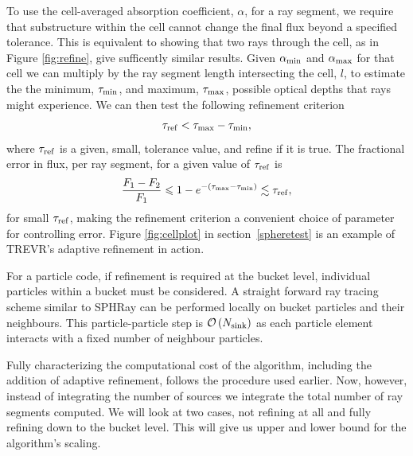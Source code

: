 \documentclass[fleq,usenatbib]{mnras}
\newcommand{\acro}{TREVR}
\newcommand{\bigO}[1]{\mathcal{O}\left(#1\right)}
\newcommand{\NK}{N_{\rm sink}}
\newcommand{\tr}{\tau_{\rm ref}}
\begin{document}
{To use the cell-averaged absorption coefficient, $\alpha$, for a ray segment,
we require that substructure within the cell cannot change the final flux
beyond a specified tolerance.
This is equivalent to showing that two rays through the cell,
as in Figure \ref{fig:refine}, give sufficently similar results.
Given $\alpha_{\rm min}$ and $\alpha_{\rm max}$ for that cell we can multiply
by the ray segment length intersecting the cell, 
$l$, to estimate the the minimum, $\tau_{\rm min}$, and maximum, $\tau_{\rm max}$,
possible optical depths that rays might experience.
We can then test the following refinement criterion
\begin{equation}
\label{eqn:refcrit}
\tr < \tau_{\rm max} - \tau_{\rm min},
\end{equation}
where $\tr$ is a given, small, tolerance value, and refine if it is true. The 
fractional error in flux, per ray segment, for a given value of $\tr$ is
\begin{equation}
\label{eqn:reffrac}
\frac{F_1 - F_2}{F_1} \leq 1 - e^{-(\tau_{\rm max}-\tau_{\rm min})} 
\lesssim \tr,
\end{equation}
for small $\tr$, making the refinement criterion a convenient choice of 
parameter for controlling error. Figure \ref{fig:cellplot} in section~\ref{spheretest}
is an example of 
\acro{}'s adaptive refinement in action.

For a particle code, if refinement is required at the bucket level, individual particles 
within a bucket must be considered.  A straight forward ray tracing scheme 
similar to SPHRay \citep{altayEt08} can be performed locally on bucket particles and 
their neighbours.   This particle-particle step is $\bigO{\NK}$ as each particle element
interacts with a fixed number of neighbour particles.

Fully characterizing the computational cost of the algorithm, including the 
addition of adaptive refinement, follows the procedure used earlier. 
Now, however, instead of integrating the number of sources we integrate the 
total number of ray segments computed. We will look at two cases, not refining 
at all and fully refining down to the bucket level. This will give us upper 
and lower bound for the algorithm's scaling.

}
\end{document}
